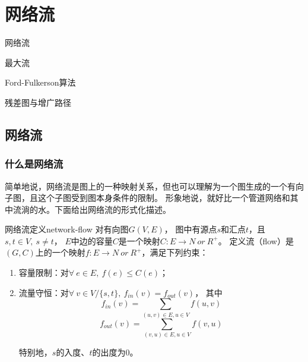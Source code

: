 \chapter{网络流}

\begin{introduction}
	\item 网络流
	\item 最大流
	\item Ford-Fulkerson算法
	\item 残差图与增广路径
\end{introduction}

\section{网络流}

\subsection{什么是网络流}

	\par 简单地说，网络流是图上的一种映射关系，但也可以理解为一个图生成的一个有向子图，且这个子图受到图本身条件的限制。
		形象地说，就好比一个管道网络和其中流淌的水。下面给出网络流的形式化描述。

\begin{definition}{网络流定义}{network-flow}
	对有向图\(G(V, E)\)，
	图中有源点\(s\)和汇点\(t\)，且\(s, t \in V,\ s \ne t\)，
	\(E\)中边的容量\(C\)是一个映射\(C:E \to N\ or\ R^+\)。
	定义流（flow）是\((G, C)\)上的一个映射\(f:E \to N\ or\ R^+\)，满足下列约束：
	
	\begin{enumerate}[(1)]
	\item 容量限制：对\(\forall\ e \in E,\ f(e) \le C(e)\)；
	
	\item 流量守恒：对\(\forall\ v \in V / \{s, t\},\ f_{in}(v) = f_{out}(v)\)，
	其中
	\begin{equation}\nonumber
	f_{in}(v) = \sum_{(u,v) \in E, u \in V} f(u,v)
	\end{equation}
	\begin{equation}\nonumber
	f_{out}(v) = \sum_{(v,u) \in E, u \in V} f(v,u)
	\end{equation}
	
	特别地，\(s\)的入度、\(t\)的出度为0。
	\end{enumerate}

\end{definition}

